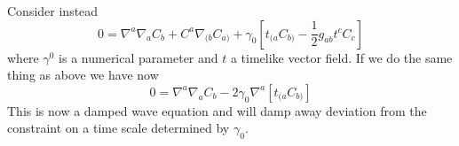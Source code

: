 \documentclass[letterpaper, 11pt]{article}
\numberwithin{equation}{section}
\numberwithin{figure}{section}
\begin{document}
Consider instead
\begin{equation}
  \label{eq:31}
  0 = \nabla^{a}\nabla_{a}C_{b} + C^{a}\nabla_{(b}C_{a)} + \gamma_0 \left[ t_{(a}C_{b)} - \frac{1}{2}g_{ab}t^{c}C_{c} \right]
\end{equation}
where $\gamma^0$ is a numerical parameter and $t$ a timelike vector field. If we
do the same thing as above we have now
\begin{equation}
  \label{eq:32}
  0 = \nabla^{a}\nabla_{a}C_{b} - 2\gamma_{0}\nabla^{a}\left[ t_{(a}C_{b)} \right]
\end{equation}
This is now a damped wave equation and will damp away deviation from the
constraint on a time scale determined by $\gamma_{0}$.
\end{document}
